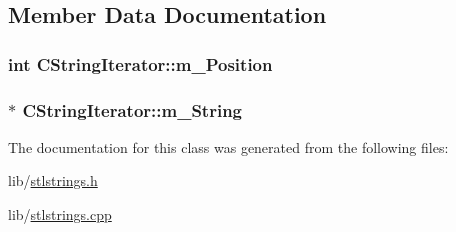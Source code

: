 \subsection{Member Data Documentation}
\hypertarget{classCStringIterator_a53f30020be11b8274529d107a6b7e6b4}{
\subsubsection[{m\-\_\-\-Position}]{\setlength{\rightskip}{0pt plus 5cm}int C\-String\-Iterator\-::m\-\_\-\-Position\hspace{0.3cm}{\ttfamily [protected]}}}\label{classCStringIterator_a53f30020be11b8274529d107a6b7e6b4}
\hypertarget{classCStringIterator_a2ec3bb2a3446e69b641befea3f041170}{
\subsubsection[{m\-\_\-\-String}]{$\ast$ C\-String\-Iterator\-::m\-\_\-\-String\hspace{0.3cm}{\ttfamily [protected]}}}\label{classCStringIterator_a2ec3bb2a3446e69b641befea3f041170}


The documentation for this class was generated from the following files\-:\begin{DoxyCompactItemize}
\item 
lib/\hyperlink{stlstrings_8h}{stlstrings.\-h}\item 
lib/\hyperlink{stlstrings_8cpp}{stlstrings.\-cpp}\end{DoxyCompactItemize}
